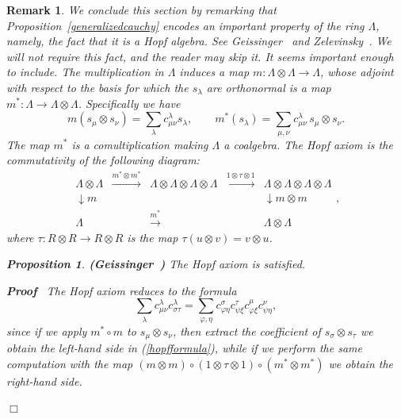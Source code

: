 \documentclass[11pt]{amsart}
\newcommand{\tmem}[1]{{\em #1\/}}
\newtheorem{proposition}{Proposition}
\renewenvironment{proof}{
\noindent\textbf{Proof}\ }{\hspace*{\fill}
\begin{math}\Box\end{math}\medskip}
\newcommand{\dueto}[1]{\textup{\textbf{(#1) }}}
\newcommand{\longrightarrowlim}{\mathop{\longrightarrow}\limits}
\newtheorem{varremark}{Remark}
\newenvironment{remark}{\begin{varremark}\em}{\em\end{varremark}}
\begin{document}
\begin{remark}
We conclude this section by remarking that
Proposition~\ref{generalizedcauchy} encodes an important property
of the ring $\Lambda$, namely, the fact that it is a {\tmem{Hopf
algebra}}. See Geissinger~{\cite{Geissinger}} and
Zelevinsky~{\cite{Zelevinsky}}.   We will not require this fact,
and the reader may skip it. It seems important enough to include.
The multiplication in $\Lambda$ induces a map $m : \Lambda \otimes
\Lambda \longrightarrow \Lambda$, whose adjoint with respect to
the basis for which the $s_{\lambda}$ are orthonormal is a map
$m^{\ast} : \Lambda \longrightarrow \Lambda \otimes \Lambda$.
Specifically we have
\[ m ( s_{\mu} \otimes s_{\nu} ) = \sum_{\lambda} c^{\lambda}_{\mu \nu}
  s_{\lambda}, \hspace{2em} m^{\ast} ( s_{\lambda} ) = \sum_{\mu, \nu}
  c^{\lambda}_{\mu \nu} \, s_{\mu} \otimes s_{\nu} . \]
The map $m^{\ast}$ is a comultiplication making $\Lambda$ a
coalgebra. The {\tmem{Hopf axiom}} is the commutativity of the
following diagram:
\[ \begin{array}{ccccc}
    \Lambda \otimes \Lambda & \longrightarrowlim^{m^{\ast} \otimes m^{\ast}}
    & \Lambda \otimes \Lambda \otimes \Lambda \otimes \Lambda &
    \longrightarrowlim^{1 \otimes \tau \otimes 1} & \Lambda \otimes \Lambda
    \otimes \Lambda \otimes \Lambda\\
    \downarrow {\scriptstyle m} &  &  &  & \downarrow
    {\scriptstyle m \otimes m}\\
    \Lambda &  & \longrightarrowlim^{m^{\ast}} &  & \Lambda \otimes \Lambda
  \end{array}, \]
where $\tau : R \otimes R \longrightarrow R \otimes R$ is the map
$\tau ( u \otimes v ) = v \otimes u$.

\begin{proposition}
{\dueto{Geissinger~{\cite{Geissinger}}}}The Hopf axiom is
satisfied.
\end{proposition}



\begin{proof}
The Hopf axiom reduces to the formula
\begin{equation}
   \label{hopfformula} \sum_{\lambda} c_{\mu \nu}^{\lambda}
   c^{\lambda}_{\sigma \tau} = \sum_{\varphi, \eta} c_{\varphi
   \eta}^{\sigma} c^{\tau}_{\psi \xi} c_{\varphi \xi}^{\mu} c_{\psi
   \eta}^{\nu},
\end{equation}
since if we apply $m^{\ast} \circ m$ to $s_{\mu} \otimes s_{\nu}$,
then extract the coefficient of $s_{\sigma} \otimes s_{\tau}$ we
obtain the left-hand side in (\ref{hopfformula}), while if we
perform the same computation with the map $( m \otimes m ) \circ (
1 \otimes \tau \otimes 1 ) \circ ( m^{\ast} \otimes m^{\ast} )$ we
obtain the right-hand side.


\end{proof}
\end{remark}
\end{document}
